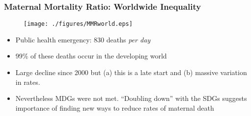\documentclass[9pt,letterpaper,subeqn]{beamer}
\begin{document}

\begin{frame}[label=MMRmap]
\frametitle{Maternal Mortality Ratio: Worldwide Inequality}
\begin{figure}[h!]
\centering
\texttt{[image: ./figures/MMRworld.eps]}
\end{figure}
\begin{itemize}
\item Public health emergency: 830 deaths \emph{per day}
\item 99\% of these deaths occur in the developing world
\item Large decline since 2000 but (a) this is a late start and (b) massive variation in rates.
\item Nevertheless MDGs were not met.  ``Doubling down'' with the SDGs suggests
  importance of finding new ways to reduce rates of maternal death
\end{itemize}
\end{frame}


\end{document}
